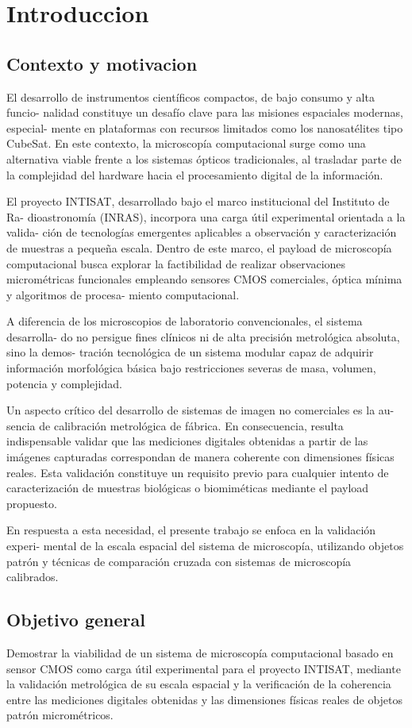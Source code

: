 ﻿\chapter{Introduccion}
\section{Contexto y motivacion}
El desarrollo de instrumentos científicos compactos, de bajo consumo y alta funcio-
nalidad constituye un desafío clave para las misiones espaciales modernas, especial-
mente en plataformas con recursos limitados como los nanosatélites tipo CubeSat.
En este contexto, la microscopía computacional surge como una alternativa viable
frente a los sistemas ópticos tradicionales, al trasladar parte de la complejidad del
hardware hacia el procesamiento digital de la información.

El proyecto INTISAT, desarrollado bajo el marco institucional del Instituto de Ra-
dioastronomía (INRAS), incorpora una carga útil experimental orientada a la valida-
ción de tecnologías emergentes aplicables a observación y caracterización de muestras
a pequeña escala. Dentro de este marco, el payload de microscopía computacional
busca explorar la factibilidad de realizar observaciones micrométricas funcionales
empleando sensores CMOS comerciales, óptica mínima y algoritmos de procesa-
miento computacional.

A diferencia de los microscopios de laboratorio convencionales, el sistema desarrolla-
do no persigue fines clínicos ni de alta precisión metrológica absoluta, sino la demos-
tración tecnológica de un sistema modular capaz de adquirir información morfológica
básica bajo restricciones severas de masa, volumen, potencia y complejidad.

Un aspecto crítico del desarrollo de sistemas de imagen no comerciales es la au-
sencia de calibración metrológica de fábrica. En consecuencia, resulta indispensable
validar que las mediciones digitales obtenidas a partir de las imágenes capturadas
correspondan de manera coherente con dimensiones físicas reales. Esta validación
constituye un requisito previo para cualquier intento de caracterización de muestras
biológicas o biomiméticas mediante el payload propuesto.

En respuesta a esta necesidad, el presente trabajo se enfoca en la validación experi-
mental de la escala espacial del sistema de microscopía, utilizando objetos patrón y
técnicas de comparación cruzada con sistemas de microscopía calibrados.
\section{Objetivo general}
Demostrar la viabilidad de un sistema de microscopía computacional basado en
sensor CMOS como carga útil experimental para el proyecto INTISAT, mediante la
validación metrológica de su escala espacial y la verificación de la coherencia entre
las mediciones digitales obtenidas y las dimensiones físicas reales de objetos patrón
micrométricos.

